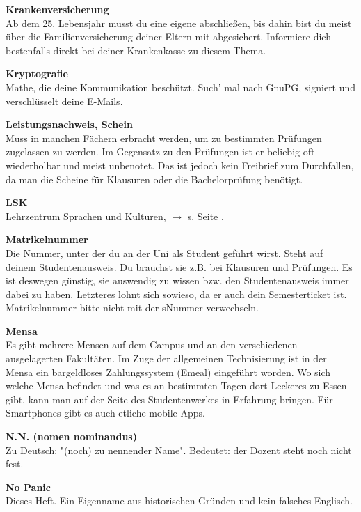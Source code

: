 \begin{multicols}{2}
\textbf{Krankenversicherung} \\
Ab dem 25. Lebensjahr musst du eine eigene abschließen, bis dahin bist du meist über die Familienversicherung deiner Eltern mit abgesichert.
Informiere dich bestenfalls direkt bei deiner Krankenkasse zu diesem Thema.

\textbf{Kryptografie} \\
Mathe, die deine Kommunikation beschützt.
Such' mal nach GnuPG, signiert und verschlüsselt deine E-Mails.

\textbf{Leistungsnachweis, Schein} \\
Muss in manchen Fächern erbracht werden, um zu bestimmten Prüfungen zugelassen zu werden.
Im Gegensatz zu den Prüfungen ist er beliebig oft wiederholbar und meist unbenotet.
Das ist jedoch kein Freibrief zum Durchfallen, da man die Scheine für Klausuren oder die Bachelorprüfung benötigt.

\textbf{LSK} \\
Lehrzentrum Sprachen und Kulturen, $\rightarrow$ s. Seite \pageref{sec:sprachausbildung}.

\textbf{Matrikelnummer} \\
Die Nummer, unter der du an der Uni als Student geführt wirst.
Steht auf deinem Studentenausweis.
Du brauchst sie z.B. bei Klausuren und Prüfungen.
Es ist deswegen günstig, sie auswendig zu wissen bzw. den Studentenausweis immer dabei zu haben.
Letzteres lohnt sich sowieso, da er auch dein Semesterticket ist.
Matrikelnummer bitte nicht mit der sNummer verwechseln.

\textbf{Mensa} \\
Es gibt mehrere Mensen auf dem Campus und an den verschiedenen ausgelagerten Fakultäten.
Im Zuge der allgemeinen Technisierung ist in der Mensa ein bargeldloses Zahlungssystem (Emeal) eingeführt worden.
Wo sich welche Mensa befindet und was es an bestimmten Tagen dort Leckeres zu Essen gibt, kann man auf der Seite des Studentenwerkes in Erfahrung bringen. 
Für Smartphones gibt es auch etliche mobile Apps.

\textbf{N.N. (nomen nominandus)} \\
Zu Deutsch:
"(noch) zu nennender Name".
Bedeutet:
der Dozent steht noch nicht fest.

\textbf{No Panic} \\
Dieses Heft.
Ein Eigenname aus historischen Gründen und kein falsches Englisch.


\end{multicols}
